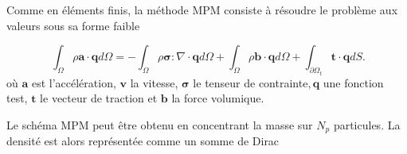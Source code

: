 Comme en éléments finis, la méthode MPM consiste à résoudre le problème aux valeurs sous sa forme faible

\begin{equation*}~\label{eq:form_faible}
    \int_\Omega \rho \bm a \cdot \bm q d\Omega = - \int_\Omega \rho \bm \sigma : \nabla \cdot \bm q d\Omega + \int_\Omega \rho \bm b\cdot \bm q d\Omega + \int_{\partial \Omega_t}  \bm t \cdot \bm q dS.
\end{equation*}où $\bm a$ est l'accélération, $\bm v$ la vitesse, $\bm \sigma$ le tenseur de contrainte$, \bm q$ une fonction test, $\bm t$ le vecteur de traction et $\bm b$ la force volumique.


Le schéma MPM peut être obtenu en concentrant la masse sur $N_p$ particules. La densité est alors représentée comme un somme de Dirac

